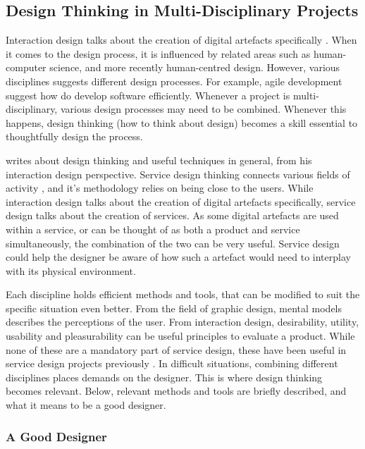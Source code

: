 \subsection{Design Thinking in Multi-Disciplinary Projects}

%

Interaction design talks about the creation of digital artefacts specifically \citep{lowgren}. When it comes to the design process, it is influenced by related areas such as human-computer science, and more recently human-centred design. However, various disciplines suggests different design processes. For example, agile development suggest how do develop software efficiently. Whenever a project is multi-disciplinary, various design processes may need to be combined. Whenever this happens, design thinking (how to think about design) becomes a skill essential to thoughtfully design the process.

\cite{lowgren} writes about design thinking and useful techniques in general, from his interaction design perspective. Service design thinking connects various fields of activity \citep{stickdorn}, and it's methodology relies on being close to the users. While interaction design talks about the creation of digital artefacts specifically, service design talks about the creation of services. As some digital artefacts are used within a service, or can be thought of as both a product and service simultaneously, the combination of the two can be very useful. Service design could help the designer be aware of how such a artefact would need to interplay with its physical environment.

Each discipline holds efficient methods and tools, that can be modified to suit the specific situation even better. From the field of graphic design, mental models describes the perceptions of the user. From interaction design, desirability, utility, usability and pleasurability can be useful principles to evaluate a product. While none of these are a mandatory part of service design, these have been useful in service design projects previously \citep{stickdorn}. In difficult situations, combining different disciplines places demands on the designer. This is where design thinking becomes relevant. Below, relevant methods and tools are briefly described, and what it means to be a good designer.

\subsubsection{A Good Designer}\label{aGoodDesigner}

